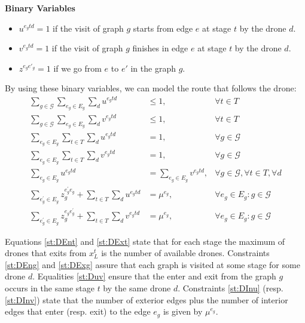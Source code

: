\documentclass[10pt,a4paper]{article}
\newcommand{\LA}[1]{{\color{blue}#1}}
\begin{document}
\textbf{Binary Variables}
\begin{itemize}
  \item $u^{{e_g}td} = 1$ if the visit of graph $g$ starts from edge $e$ at stage $t$ by the drone $d$.
  \item $v^{{e_g}td}= 1$ if the visit of graph $g$ finishes in edge $e$ at stage $t$ by the drone $d$.
  \item $z^{e_ge'_g}= 1$ if we go from $e$ to $e'$ in the graph $g$.
\end{itemize}

By using these binary variables, we can model the route that follows the drone:
\begin{align}
    \sum_{g\in \mathcal G}\sum_{e_g\in E_g} \sum_d u^{e_gtd} & \leq 1, &\forall t\in T \label{st:DEnt}\\%
    \sum_{g\in\mathcal G}\sum_{e_g\in E_g} \sum_d v^{e_gtd} & \leq 1, &\forall t\in T \label{st:DExt}\\%
    \sum_{e_g\in E_g} \sum_{t\in T} \sum_{d} u^{e_gtd} & = 1, &\forall g\in\mathcal G \label{st:DEng}\\%
    \sum_{e_g\in E_g} \sum_{t\in T} \sum_{d} v^{e_gtd} & = 1, &\forall g\in\mathcal G \label{st:DExg}\\%
    \sum_{e_g\in E_g} u^{e_gtd} & = \sum_{e_g\in E_g} v^{e_gtd}, &\forall g\in\mathcal G, \forall t\in T, \forall d \label{st:Duv}\\%
    \sum_{e^\prime_g\in E_g} z_g^{e^\prime_ge_g} + \sum_{t\in T} \sum_{d} u^{e_gtd} & = \mu^{e_g}, &\forall e_g\in E_g:g\in\mathcal G \label{st:DInu}\\
    \sum_{e^\prime_g\in E_g} z_g^{e_ge^\prime_g} + \sum_{t\in T} \sum_{d} v^{e_gtd} & = \mu^{e_g}, &\forall e_g\in E_g:g\in\mathcal G \label{st:DInv}
\end{align}

Equations \eqref{st:DEnt} and \eqref{st:DExt} state that for each stage the maximum of drones that exits from $x_L^t$ is the number of available drones. Constraints \eqref{st:DEng} and \eqref{st:DExg} assure that each graph is visited at some stage for some drone $d$. Equalities \eqref{st:Duv} ensure that the enter and exit from the graph $g$ occurs in the same stage $t$ by the same drone $d$. Constraints \eqref{st:DInu} (resp. \eqref{st:DInv}) \LA{state} that the number of exterior edges plus the number of interior edges that enter (resp. exit) to the edge $e_g$ is given by $\mu^{e_g}$.
\end{document}
